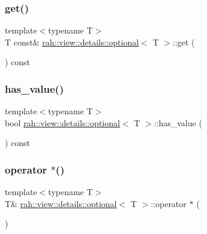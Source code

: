 \subsubsection{\texorpdfstring{get()}{get()}\hspace{0.1cm}{\footnotesize\ttfamily [2/2]}}
{\footnotesize\ttfamily template$<$typename T$>$ \\
T const\& \mbox{\hyperlink{structrah_1_1view_1_1details_1_1optional}{rah\+::view\+::details\+::optional}}$<$ T $>$\+::get (\begin{DoxyParamCaption}{ }\end{DoxyParamCaption}) const\hspace{0.3cm}{\ttfamily [inline]}}

\mbox{\label{structrah_1_1view_1_1details_1_1optional_a0d9e2223f4ef142e49b25d6553b306f3}} 
\subsubsection{\texorpdfstring{has\_value()}{has\_value()}}
{\footnotesize\ttfamily template$<$typename T$>$ \\
bool \mbox{\hyperlink{structrah_1_1view_1_1details_1_1optional}{rah\+::view\+::details\+::optional}}$<$ T $>$\+::has\+\_\+value (\begin{DoxyParamCaption}{ }\end{DoxyParamCaption}) const\hspace{0.3cm}{\ttfamily [inline]}}

\mbox{\label{structrah_1_1view_1_1details_1_1optional_a551608196fdf9f460b841a41402c827a}} 
\subsubsection{\texorpdfstring{operator $\ast$()}{operator *()}\hspace{0.1cm}{\footnotesize\ttfamily [1/2]}}
{\footnotesize\ttfamily template$<$typename T$>$ \\
T\& \mbox{\hyperlink{structrah_1_1view_1_1details_1_1optional}{rah\+::view\+::details\+::optional}}$<$ T $>$\+::operator $\ast$ (\begin{DoxyParamCaption}{ }\end{DoxyParamCaption})\hspace{0.3cm}{\ttfamily [inline]}}

